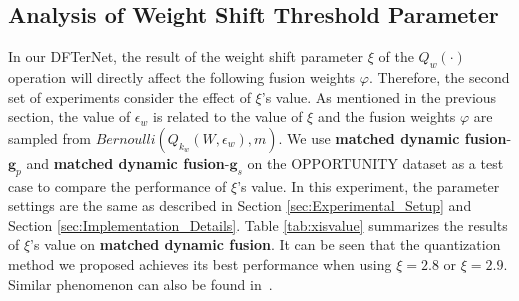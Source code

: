 \documentclass[twoside,twocolumn]{article}
\begin{document}
\subsection{Analysis of Weight Shift Threshold Parameter}
In our DFTerNet, the result of the weight shift parameter $\xi$ of the $Q_w(\cdot)$ operation will directly affect the following fusion weights $\varphi$. Therefore, the second set of experiments consider the effect of $\xi$'s value. As mentioned in the previous section, the value of $\epsilon_w$ is related to the value of $\xi$ and the fusion weights $\varphi$ are sampled from $Bernoulli(Q_{k_w}(W,\epsilon_w),m)$. We use \textbf{matched dynamic fusion}-$\boldsymbol{g}_p$ and \textbf{matched dynamic fusion}-$\boldsymbol{g}_s$ on the OPPORTUNITY dataset as a test case to compare the performance of $\xi$'s value. In this experiment, the parameter settings are the same as described in Section \ref{sec:Experimental_Setup} and Section \ref{sec:Implementation_Details}. Table \ref{tab:xisvalue} summarizes the results of $\xi$'s value on \textbf{matched dynamic fusion}. It can be seen that the quantization method we proposed achieves its best performance when using $\xi=2.8$ or $\xi=2.9$. Similar phenomenon can also be found in~\cite{b13}.
\end{document}
